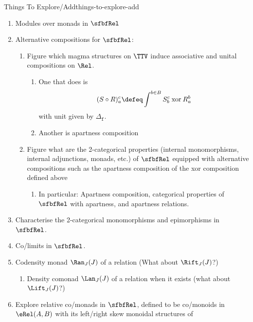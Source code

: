 \begin{remark}{Things To Explore/Add}{things-to-explore-add}
    \begin{enumerate}
        \item Modules over monads in $\sfbfRel$
        \item Alternative compositions for $\sfbfRel$:
            \begin{enumerate}
                \item Figure which magma structures on $\TTV$ induce associative and unital compositions on $\Rel$.
                    \begin{enumerate}
                        \item One that does is
                            \[
                                (S\circ R)^{c}_{a}%
                                \defeq%
                                \int^{b\in B}S^{c}_{b}\mathbin{\text{xor}}R^{b}_{a}%
                            \]%
                            with unit given by $\Delta_{\mathtt{f}}$.
                        \item Another is apartness composition
                    \end{enumerate}
                \item Figure what are the 2-categorical properties (internal monomorphisms, internal adjunctions, monads, etc.) of $\sfbfRel$ equipped with alternative compositions such as the apartness composition of the xor composition defined above
                    \begin{enumerate}
                        \item In particular: Apartness composition, categorical properties of $\sfbfRel$ with apartness, and apartness relations.
                    \end{enumerate}
            \end{enumerate}
        \item Characterise the 2-categorical monomorphisms and epimorphisms in $\sfbfRel$.
        \item Co/limits in $\sfbfRel$.
        \item Codensity monad $\Ran_{J}(J)$ of a relation (What about $\Rift_{J}(J)$?)
            \begin{enumerate}
                \item Density comonad $\Lan_{J}(J)$ of a relation when it exists (what about $\Lift_{J}(J)$?)
            \end{enumerate}
        \item Explore relative co/monads in $\sfbfRel$, defined to be co/monoids in $\eRel(A,B)$ with its left/right skew monoidal structures of 

\end{enumerate}
\end{remark}
